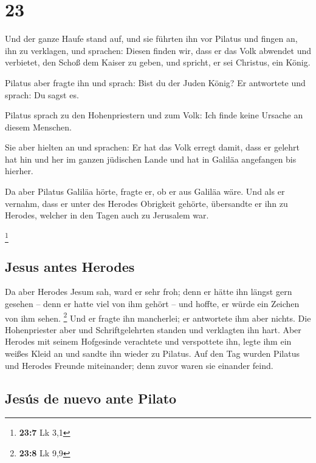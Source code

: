 \hypertarget{section-22}{%
\section{23}\label{section-22}}

 Und der ganze Haufe stand auf, und sie führten ihn vor
Pilatus  und fingen an, ihn zu verklagen, und sprachen:
Diesen finden wir, dass er das Volk abwendet und verbietet, den Schoß
dem Kaiser zu geben, und spricht, er sei Christus, ein König.

 Pilatus aber fragte ihn und sprach: Bist du der Juden
König? Er antwortete und sprach: Du sagst es.

 Pilatus sprach zu den Hohenpriestern und zum Volk: Ich
finde keine Ursache an diesem Menschen.

 Sie aber hielten an und sprachen: Er hat das Volk erregt
damit, dass er gelehrt hat hin und her im ganzen jüdischen Lande und hat
in Galiläa angefangen bis hierher.

 Da aber Pilatus Galiläa hörte, fragte er, ob er aus
Galiläa wäre.  Und als er vernahm, dass er unter des
Herodes Obrigkeit gehörte, übersandte er ihn zu Herodes, welcher in den
Tagen auch zu Jerusalem war.

\footnote{\textbf{23:7} Lk 3,1}

\hypertarget{jesus-antes-herodes}{%
\subsection{Jesus antes Herodes}\label{jesus-antes-herodes}}

 Da aber Herodes Jesum sah, ward er sehr froh; denn er
hätte ihn längst gern gesehen -- denn er hatte viel von ihm gehört --
und hoffte, er würde ein Zeichen von ihm sehen. \footnote{\textbf{23:8}
  Lk 9,9}  Und er fragte ihn mancherlei; er antwortete ihm
aber nichts.  Die Hohenpriester aber und Schriftgelehrten
standen und verklagten ihn hart.  Aber Herodes mit seinem
Hofgesinde verachtete und verspottete ihn, legte ihm ein weißes Kleid an
und sandte ihn wieder zu Pilatus.  Auf den Tag wurden
Pilatus und Herodes Freunde miteinander; denn zuvor waren sie einander
feind.

\hypertarget{jesuxfas-de-nuevo-ante-pilato}{%
\subsection{Jesús de nuevo ante
Pilato}\label{jesuxfas-de-nuevo-ante-pilato}}

